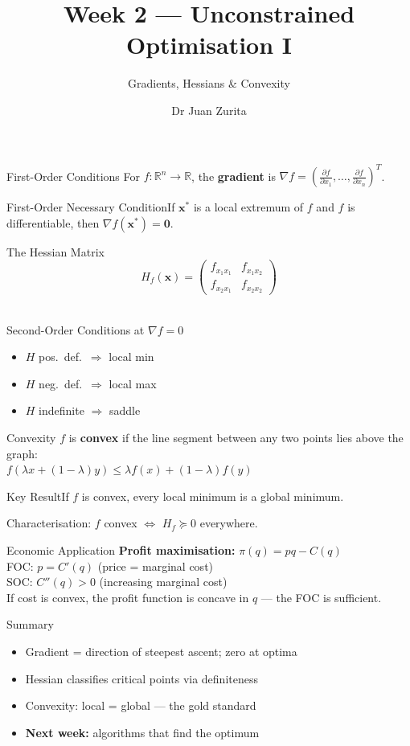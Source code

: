 \documentclass[aspectratio=169, 10pt]{beamer}
\title{Week 2 --- Unconstrained Optimisation I}
\subtitle{Gradients, Hessians \& Convexity}
\author{Dr Juan Zurita}
\institute{Optimisation \& Mathematical Methods for Economics\\
The University of Edinburgh~$\cdot$~School of Economics}
\date{}
\begin{document}
\maketitle

\begin{frame}{First-Order Conditions}
For $f:\mathbb{R}^n\to\mathbb{R}$, the \textbf{gradient} is $\nabla f = \left(\frac{\partial f}{\partial x_1},\ldots,\frac{\partial f}{\partial x_n}\right)^T$.\\\bigskip\begin{block}{First-Order Necessary Condition}If $\mathbf{x}^*$ is a local extremum of $f$ and $f$ is differentiable, then $\nabla f(\mathbf{x}^*) = \mathbf{0}$.\end{block}
\end{frame}

\begin{frame}{The Hessian Matrix}
$$H_f(\mathbf{x}) = \begin{pmatrix} f_{x_1x_1} & f_{x_1x_2} \\ f_{x_2x_1} & f_{x_2x_2}\end{pmatrix}$$\\\bigskip\begin{block}{Second-Order Conditions at $\nabla f = 0$}\begin{itemize}\item $H$ pos.\ def.\ $\Rightarrow$ local min\item $H$ neg.\ def.\ $\Rightarrow$ local max\item $H$ indefinite $\Rightarrow$ saddle\end{itemize}\end{block}
\end{frame}

\begin{frame}{Convexity}
$f$ is \textbf{convex} if the line segment between any two points lies above the graph:\\ $f(\lambda x + (1-\lambda)y) \leq \lambda f(x) + (1-\lambda)f(y)$\\\bigskip\begin{block}{Key Result}If $f$ is convex, every local minimum is a \alert{global} minimum.\end{block}\par\bigskip Characterisation: $f$ convex $\iff$ $H_f \succeq 0$ everywhere.
\end{frame}

\begin{frame}{Economic Application}
\textbf{Profit maximisation:} $\pi(q) = pq - C(q)$\\\bigskip FOC: $p = C'(q)$ (price = marginal cost)\\\bigskip SOC: $C''(q) > 0$ (increasing marginal cost)\\\bigskip If cost is convex, the profit function is concave in $q$ --- the FOC is sufficient.
\end{frame}

\begin{frame}{Summary}
\begin{itemize}\item Gradient = direction of steepest ascent; zero at optima\item Hessian classifies critical points via definiteness\item Convexity: local = global --- the gold standard\item \textbf{Next week:} algorithms that find the optimum\end{itemize}
\end{frame}
\end{document}
